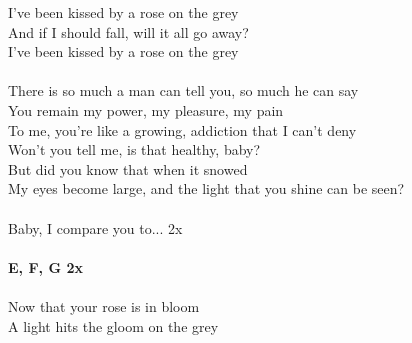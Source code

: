 I've been kissed by a rose on the grey\\
And if I should fall, will it all go away?\\
I've been kissed by a rose on the grey\\
\\
There is so much a man can tell you, so much he can say\\
You remain my power, my pleasure, my pain\\
To me, you're like a growing, addiction that I can't deny\\
Won't you tell me, is that healthy, baby?\\
But did you know that when it snowed\\
My eyes become large, and the light that you shine can be seen?\\
\\
Baby, I compare you to... 2x\\
\\
\footnotesize\textbf{E\be, F, G 2x}\\
\\
\normalsize
Now that your rose is in bloom\\
A light hits the gloom on the grey\\